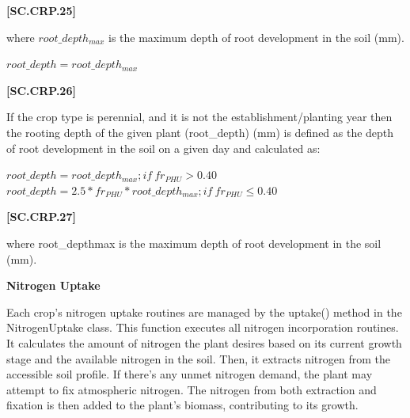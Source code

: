             {\raggedleft \textbf{[SC.CRP.25]}\par}
            \vspace{0.5cm}

where \(root\_depth_{max}\) is the maximum depth of root development in the soil (mm). 
    \vspace{0.2cm}

    \begin{center}
        \(root\_depth = root\_depth_{max}\)
    \end{center}
        \vspace{0.5cm}
    
            {\raggedleft \textbf{[SC.CRP.26]}\par}
            \vspace{0.5cm}

If the crop type is perennial, and it is not the establishment/planting year then the rooting depth of the given plant (root\_depth) (mm) is defined as the depth of root development in the soil on a given day and calculated as:
    \vspace{0.2cm}

    \begin{center}
        \(root\_depth = root\_depth_{max}; if\ fr_{PHU} > 0.40\)\\
        \(root\_depth = 2.5 * fr_{PHU} * root\_depth_{max}; if\ fr_{PHU} \leq 0.40\)
    \end{center}
        \vspace{0.5cm}
    
            {\raggedleft \textbf{[SC.CRP.27]}\par}
            \vspace{0.5cm}

where root\_depthmax is the maximum depth of root development in the soil (mm). 
\vspace{0.25cm}

\textbf{Nitrogen Uptake}
\vspace{0.2cm}

Each crop’s nitrogen uptake routines are managed by the uptake() method in the NitrogenUptake class. This function executes all nitrogen incorporation routines. It calculates the amount of nitrogen the plant desires based on its current growth stage and the available nitrogen in the soil. Then, it extracts nitrogen from the accessible soil profile. If there's any unmet nitrogen demand, the plant may attempt to fix atmospheric nitrogen. The nitrogen from both extraction and fixation is then added to the plant's biomass, contributing to its growth.

